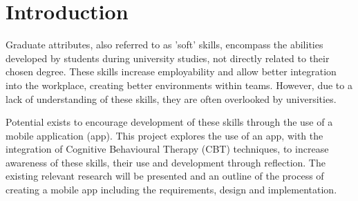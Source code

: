 \documentclass{l4proj}
\begin{document}
%
%
%
%
%
%
%
%
\chapter{Introduction}


Graduate attributes, also referred to as 'soft' skills, encompass the abilities developed by students during university studies, not directly related to their chosen degree. These skills increase employability and allow better integration into the workplace, creating better environments within teams. However, due to a lack of understanding of these skills, they are often overlooked by universities. 

Potential exists to encourage development of these skills through the use of a mobile application (app). This project explores the use of an app, with the integration of Cognitive Behavioural Therapy (CBT) techniques, to increase awareness of these skills, their use and development through reflection. The existing relevant research will be presented and an outline of the process of creating a mobile app including the requirements, design and implementation.
\end{document}
